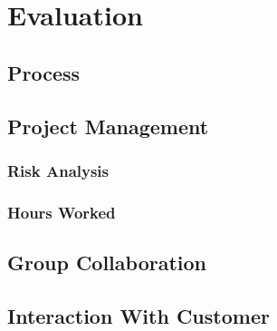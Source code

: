 
\chapter{Evaluation}

\section{Process}

\section{Project Management}
\subsection{Risk Analysis}
\subsection{Hours Worked}

\section{Group Collaboration}

\section{Interaction With Customer}


\cleardoublepage